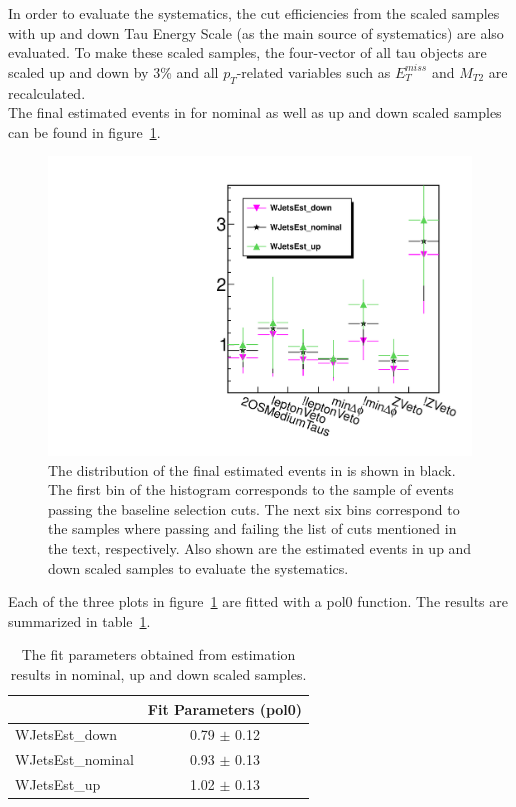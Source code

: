In order to evaluate the systematics, the cut efficiencies from the scaled samples with 
up and down Tau Energy Scale (as the main source of systematics) are also evaluated.
To make these scaled samples, the four-vector of all tau objects 
are scaled up and down by 3\% and all $p_T$-related variables such as $E_T^{miss}$ 
and $M_{T2}$ are recalculated.\\
The final estimated \wjets events in \binone for nominal as well as up and down scaled samples 
can be found in figure~\ref{fig:wjets_1}.  
\begin{figure}[!Hhtb]
\centering
\includegraphics[angle=0,scale=0.35]{TauTauFigs/WJets_bin1.pdf}
\caption{The distribution of the final estimated \wjets events in \binone is shown in black. 
 The first bin of the histogram corresponds to the sample of events passing the baseline selection cuts. 
The next six bins correspond to the samples where passing and failing the 
list of cuts mentioned in the text, respectively. Also shown are the estimated \wjets events in up and down scaled samples to evaluate the systematics.}
\label{fig:wjets_1}
\end{figure}

Each of the three plots in figure~\ref{fig:wjets_1} are fitted with a pol0 function. The results are summarized in table~\ref{tbl:fitpars}.
\begin{table}[!Hhtb]
\begin{center}
\begin{tabular}{lc}
\hline\hline
  & Fit Parameters (pol0) \\
\hline\hline
WJetsEst\_down & 0.79 $\pm$ 0.12 \\
WJetsEst\_nominal & 0.93 $\pm$ 0.13 \\
WJetsEst\_up & 1.02 $\pm$ 0.13 \\
\hline\hline
\end{tabular}
\caption{The fit parameters obtained from \wjets estimation results in nominal, up and down scaled samples.}
\label{tbl:fitpars}
\end{center}
\end{table}

